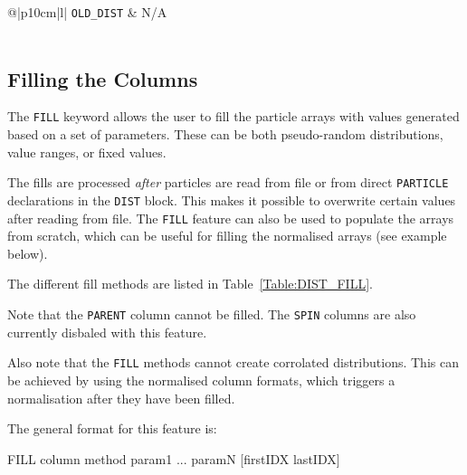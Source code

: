 \begin{center}
\begin{longtable}{@{\extracolsep{\fill}}|p{10cm}|l|}
    \rowcolor{gray!15}
    \texttt{OLD\_DIST} & N/A \\*
    \hline
    \multicolumn{2}{|>{\raggedright}p{\textwidth}|}{%
        Gives the old file format as described in Table~\ref{tab:distReadFileColumns}. That is, it's equivalent to \texttt{ID PARENT SKIP X[M] Y[M] SKIP XP[RAD] YP[RAD] SKIP ION\_A ION\_Z MASS[GEV] P[GEV] DT}.
    } \\*
    \hline

\end{longtable}
\end{center}

\subsection{Filling the Columns}

The \texttt{FILL} keyword allows the user to fill the particle arrays with values generated based on a set of parameters.
These can be both pseudo-random distributions, value ranges, or fixed values.

The fills are processed \emph{after} particles are read from file or from direct \texttt{PARTICLE} declarations in the \texttt{DIST} block.
This makes it possible to overwrite certain values after reading from file.
The \texttt{FILL} feature can also be used to populate the arrays from scratch, which can be useful for filling the normalised arrays (see example below).

The different fill methods are listed in Table~\ref{Table:DIST_FILL}.

Note that the \texttt{PARENT} column cannot be filled.
The \texttt{SPIN} columns are also currently disbaled with this feature.

Also note that the \texttt{FILL} methods cannot create corrolated distributions.
This can be achieved by using the normalised column formats, which triggers a normalisation after they have been filled.

\bigskip
\noindent The general format for this feature is:
\begin{cverbatim}
FILL column method param1 ... paramN [firstIDX lastIDX]
\end{cverbatim}

